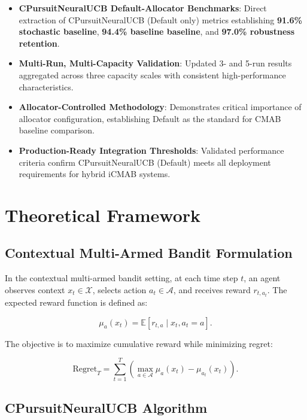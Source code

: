 \documentclass[12pt,a4paper]{article}
\newcommand{\success}[1]{\textcolor{accentgreen}{\textbf{#1}}}
\begin{document}
\begin{itemize}
    \item \textbf{CPursuitNeuralUCB Default-Allocator Benchmarks}: Direct extraction of CPursuitNeuralUCB (Default only) metrics establishing \success{91.6\% stochastic baseline}, \success{94.4\% baseline baseline}, and \success{97.0\% robustness retention}.
    
    \item \textbf{Multi-Run, Multi-Capacity Validation}: Updated 3- and 5-run results aggregated across three capacity scales with consistent high-performance characteristics.
    
    \item \textbf{Allocator-Controlled Methodology}: Demonstrates critical importance of allocator configuration, establishing Default as the standard for CMAB baseline comparison.
    
    \item \textbf{Production-Ready Integration Thresholds}: Validated performance criteria confirm CPursuitNeuralUCB (Default) meets all deployment requirements for hybrid iCMAB systems.
\end{itemize}

\section{Theoretical Framework}

\subsection{Contextual Multi-Armed Bandit Formulation}

In the contextual multi-armed bandit setting, at each time step $t$, an agent observes context $x_t \in \mathcal{X}$, selects action $a_t \in \mathcal{A}$, and receives reward $r_{t,a_t}$. The expected reward function is defined as:

\begin{equation}
\mu_a(x_t) = \mathbb{E}[r_{t,a} \mid x_t, a_t = a].
\end{equation}

The objective is to maximize cumulative reward while minimizing regret:

\begin{equation}
\text{Regret}_T = \sum_{t=1}^{T} \left(\max_{a \in \mathcal{A}} \mu_a(x_t) - \mu_{a_t}(x_t)\right).
\end{equation}

\subsection{CPursuitNeuralUCB Algorithm}
\end{document}
